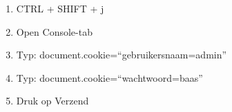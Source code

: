\begin{enumerate}
  \item CTRL + SHIFT + j
  \item Open Console-tab
  \item Typ: document.cookie=``gebruikersnaam=admin''
  \item Typ: document.cookie=``wachtwoord=baas''
  \item Druk op Verzend
\end{enumerate}